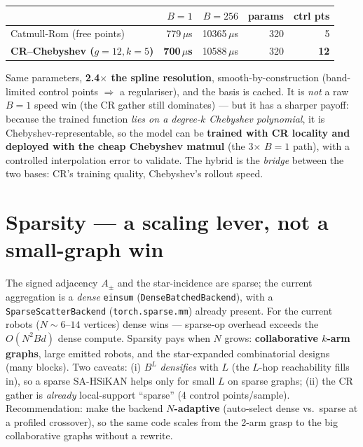 \documentclass[11pt]{article}
\begin{document}
\begin{table}[h]\centering
\begin{tabular}{lrrrr}
\toprule
 & $B{=}1$ & $B{=}256$ & params & ctrl pts \\
\midrule
Catmull-Rom (free points) & 779\,$\mu$s & 10365\,$\mu$s & 320 & 5 \\
\textbf{CR--Chebyshev ($g{=}12,k{=}5$)} & \textbf{700\,$\mu$s} & 10588\,$\mu$s & 320 & \textbf{12} \\
\bottomrule
\end{tabular}
\end{table}

\noindent Same parameters, \textbf{2.4$\times$ the spline resolution}, smooth-by-construction (band-limited control
points $\Rightarrow$ a regulariser), and the basis is cached. It is \emph{not} a raw $B{=}1$ speed win (the CR
gather still dominates) --- but it has a sharper payoff: because the trained function \emph{lies on a degree-$k$
Chebyshev polynomial}, it is Chebyshev-representable, so the model can be \textbf{trained with CR locality and
deployed with the cheap Chebyshev matmul} (the 3$\times$ $B{=}1$ path), with a controlled interpolation error to
validate. The hybrid is the \emph{bridge} between the two bases: CR's training quality, Chebyshev's rollout speed.

\section{Sparsity --- a scaling lever, not a small-graph win}
The signed adjacency $A_\pm$ and the star-incidence are sparse; the current aggregation is a \emph{dense}
\texttt{einsum} (\texttt{DenseBatchedBackend}), with a \texttt{SparseScatterBackend} (\texttt{torch.sparse.mm})
already present. For the current robots ($N\!\sim\!6$--$14$ vertices) dense wins --- sparse-op overhead exceeds the
$O(N^2 Bd)$ dense compute. Sparsity pays when $N$ grows: \textbf{collaborative $k$-arm graphs}, large emitted
robots, and the star-expanded combinatorial designs (many blocks). Two caveats: (i) $B^{L}$ \emph{densifies} with
$L$ (the $L$-hop reachability fills in), so a sparse SA-HSiKAN helps only for small $L$ on sparse graphs; (ii) the
CR gather is \emph{already} local-support ``sparse'' (4 control points/sample). Recommendation: make the backend
\textbf{$N$-adaptive} (auto-select dense vs.\ sparse at a profiled crossover), so the same code scales from the
2-arm grasp to the big collaborative graphs without a rewrite.
\end{document}
